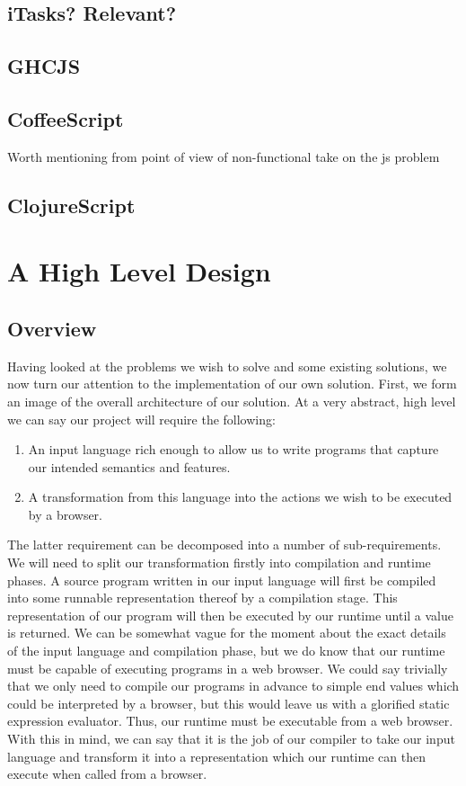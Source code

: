 \documentclass[11pt]{article}
\begin{document}
\subsection{iTasks? Relevant?}

\subsection{GHCJS}

\subsection{CoffeeScript}
Worth mentioning from point of view of non-functional take on the js problem

\subsection{ClojureScript}

\pagebreak

\section{A High Level Design}
\subsection{Overview}
Having looked at the problems we wish to solve and some existing solutions, we now turn our attention to the implementation of our own solution. First,
we form an image of the overall architecture of our solution. At a
very abstract, high level we can say our project will require the following:

\begin{enumerate}
	\item An input language rich enough to allow us to write programs
		  that capture our intended semantics and features.
	\item A transformation from this language into the actions we 
	 	  wish to be executed by a browser.
\end{enumerate}

\noindent The latter requirement can be decomposed into a number of sub-requirements.
We will need to split our transformation firstly into compilation and runtime phases.
A source program written in our input language will first be compiled into some runnable
representation thereof by a compilation stage. This representation of our program will
then be executed by our runtime until a value is returned. We can be somewhat vague
for the moment about the exact details of the input language and compilation phase, 
but we do know that our runtime must be capable of executing programs in a web browser.
We could say trivially that we only need to compile our programs in advance to simple
end values which could be interpreted by a browser, but this would leave us with a 
glorified static expression evaluator. Thus, our runtime must be executable from a
web browser. With this in mind, we can say that it is the job of our compiler to
take our input language and transform it into a representation which our runtime can
then execute when called from a browser. 
\end{document}
